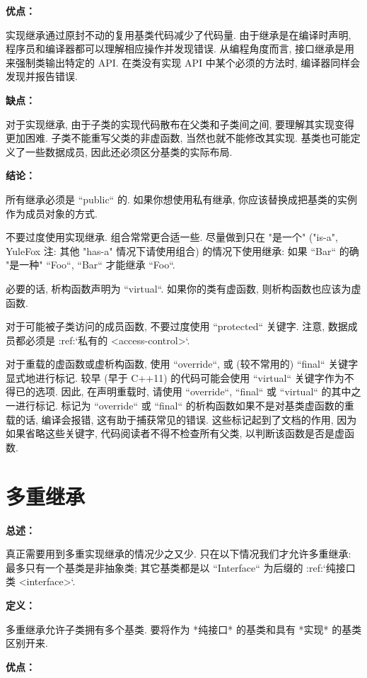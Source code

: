 \textbf{优点：}

实现继承通过原封不动的复用基类代码减少了代码量. 由于继承是在编译时声明, 程序员和编译器都可以理解相应操作并发现错误. 从编程角度而言, 接口继承是用来强制类输出特定的 API. 在类没有实现 API 中某个必须的方法时, 编译器同样会发现并报告错误.

\textbf{缺点：}

对于实现继承, 由于子类的实现代码散布在父类和子类间之间, 要理解其实现变得更加困难. 子类不能重写父类的非虚函数, 当然也就不能修改其实现. 基类也可能定义了一些数据成员, 因此还必须区分基类的实际布局.

\textbf{结论：}

所有继承必须是 ``public`` 的. 如果你想使用私有继承, 你应该替换成把基类的实例作为成员对象的方式.

不要过度使用实现继承. 组合常常更合适一些. 尽量做到只在 "是一个" ("is-a", YuleFox 注: 其他 "has-a" 情况下请使用组合) 的情况下使用继承: 如果 ``Bar`` 的确 "是一种" ``Foo``, ``Bar`` 才能继承 ``Foo``.

必要的话, 析构函数声明为 ``virtual``. 如果你的类有虚函数, 则析构函数也应该为虚函数.

对于可能被子类访问的成员函数, 不要过度使用 ``protected`` 关键字. 注意, 数据成员都必须是 :ref:`私有的 <access-control>`.

对于重载的虚函数或虚析构函数, 使用 ``override``, 或 (较不常用的) ``final`` 关键字显式地进行标记. 较早 (早于 C++11) 的代码可能会使用 ``virtual`` 关键字作为不得已的选项. 因此, 在声明重载时, 请使用 ``override``, ``final`` 或 ``virtual`` 的其中之一进行标记. 标记为 ``override`` 或 ``final`` 的析构函数如果不是对基类虚函数的重载的话, 编译会报错, 这有助于捕获常见的错误. 这些标记起到了文档的作用, 因为如果省略这些关键字, 代码阅读者不得不检查所有父类, 以判断该函数是否是虚函数.

\section{多重继承} \label{multiple-inheritance}

\textbf{总述：}

真正需要用到多重实现继承的情况少之又少. 只在以下情况我们才允许多重继承: 最多只有一个基类是非抽象类; 其它基类都是以 ``Interface`` 为后缀的 :ref:`纯接口类 <interface>`.

\textbf{定义：}

多重继承允许子类拥有多个基类. 要将作为 *纯接口* 的基类和具有 *实现* 的基类区别开来.

\textbf{优点：}

